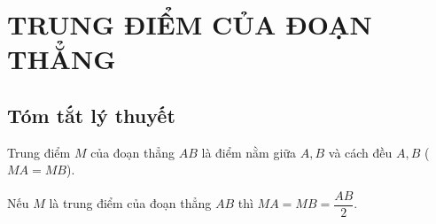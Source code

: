 \section{TRUNG ĐIỂM CỦA ĐOẠN THẲNG}
\subsection{Tóm tắt lý thuyết}
\begin{enumEX}{1}
	\item 
		Trung điểm $M$ của đoạn thẳng $AB$ là điểm nằm giữa $A,B$ và cách đều $A,B$ ($MA=MB$).
		
	\begin{center}
	\end{center}
	\item Nếu $M$ là trung điểm của đoạn thẳng $AB$ thì $MA=MB=\dfrac{AB}{2}$.
\end{enumEX}
